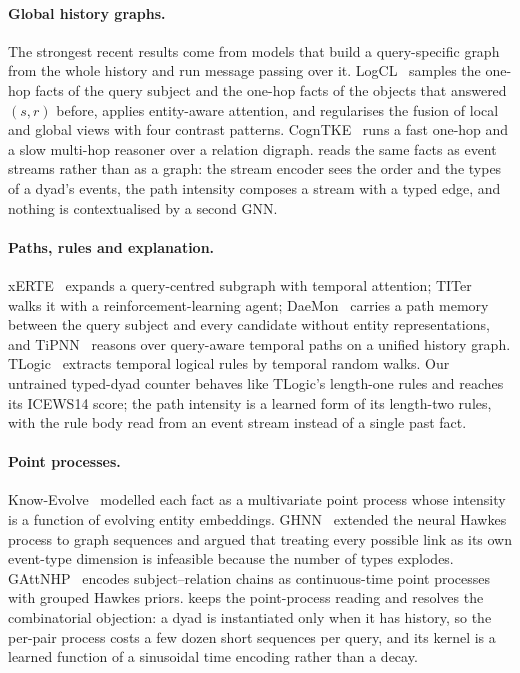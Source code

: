\paragraph{Global history graphs.}
The strongest recent results come from models that build a query-specific graph from the whole history and run message passing over it. LogCL~\cite{chen2024logcl} samples the one-hop facts of the query subject and the one-hop facts of the objects that answered $(s, r)$ before, applies entity-aware attention, and regularises the fusion of local and global views with four contrast patterns. CognTKE~\cite{chen2025cogntke} runs a fast one-hop and a slow multi-hop reasoner over a relation digraph. \model{} reads the same facts as event streams rather than as a graph: the stream encoder sees the order and the types of a dyad's events, the path intensity composes a stream with a typed edge, and nothing is contextualised by a second GNN.

\paragraph{Paths, rules and explanation.}
xERTE~\cite{han2021xerte} expands a query-centred subgraph with temporal attention; TITer~\cite{sun2021titer} walks it with a reinforcement-learning agent; DaeMon~\cite{dong2023daemon} carries a path memory between the query subject and every candidate without entity representations, and TiPNN~\cite{dong2024tipnn} reasons over query-aware temporal paths on a unified history graph. TLogic~\cite{liu2022tlogic} extracts temporal logical rules by temporal random walks. Our untrained typed-dyad counter behaves like TLogic's length-one rules and reaches its ICEWS14 score; the path intensity is a learned form of its length-two rules, with the rule body read from an event stream instead of a single past fact.

\paragraph{Point processes.}
Know-Evolve~\cite{trivedi2017knowevolve} modelled each fact as a multivariate point process whose intensity is a function of evolving entity embeddings. GHNN~\cite{han2020ghnn} extended the neural Hawkes process to graph sequences and argued that treating every possible link as its own event-type dimension is infeasible because the number of types explodes. GAttNHP~\cite{tian2026gattnhp} encodes subject--relation chains as continuous-time point processes with grouped Hawkes priors. \model{} keeps the point-process reading and resolves the combinatorial objection: a dyad is instantiated only when it has history, so the per-pair process costs a few dozen short sequences per query, and its kernel is a learned function of a sinusoidal time encoding rather than a decay.

